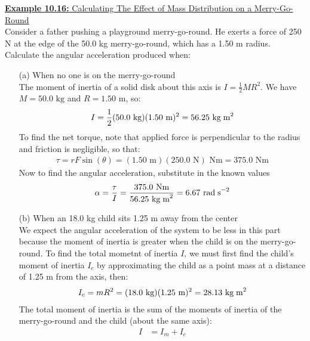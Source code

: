 \documentclass[a4paper]{article}
\let\bf\textbf
\newcommand\radss{\text{ rad\;s}^{-2}}
\newcommand\m{\text{ m}}
\newcommand\Nm{\text{ Nm}}
\newcommand\kg{\text{ kg}}
\newcommand\kgmm{\text{ kg\;m}^{2}}
\begin{document}
\begin{shaded}
    \underline{\bf{Example 10.16:} Calculating The Effect of Mass Distribution on a Merry-Go-Round}
    \vspace{2mm}\\
    Consider a father pushing a playground merry-go-round. He exerts a force of 250 N at the edge of the 50.0 kg merry-go-round, which has a 1.50 m radius. Calculate the angular acceleration produced when:
    \begin{enumerate}
        \item[(a)] When no one is on the merry-go-round \vspace{1mm}\\
        The moment of inertia of a solid disk about this axis is $\displaystyle I = \frac{1}{2}MR^2$. We have $M = 50.0\kg$ and $R = 1.50\m$, so:
        \begin{align*}
            I = \frac{1}{2}(50.0\kg)(1.50\m)^2 = 56.25\kgmm
        \end{align*}
        To find the net torque, note that applied force is perpendicular to the radius and friction is negligible, so that:
        \begin{align*}
            \tau = rF\sin(\theta) = (1.50\m)(250.0\text{ N})\Nm = 375.0\Nm
        \end{align*}
        Now to find the angular acceleration, substitute in the known values
        \begin{align*}
            \alpha = \frac{\tau}{I} = \frac{375.0\Nm}{56.25\kgmm} = 6.67\radss
        \end{align*}
        \item[(b)] When an 18.0 kg child sits 1.25 m away from the center\vspace{1mm}\\
        We expect the angular acceleration of the system to be less in this part because the moment of inertia is greater when the child is on the merry-go-round. To find the total mometnt of inertia $I$, we must first find the child's moment of inertia $I_c$ by approximating the child as a point mass at a distance of 1.25 m from the axis, then:
        \begin{align*}
            I_c = mR^2 = (18.0\kg)(1.25\m)^2 = 28.13\kgmm
        \end{align*}
        The total moment of inertia is the sum of the moments of inertia of the merry-go-round and the child (about the same axis):
        \begin{align*}
            I &= I_m + I_c\\

\end{align*}
\end{enumerate}
\end{shaded}
\end{document}
